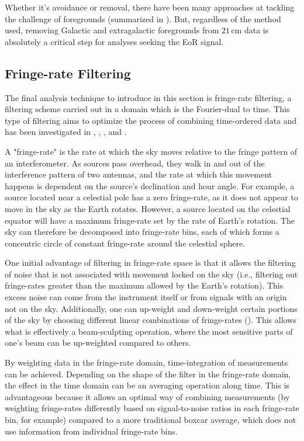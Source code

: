 Whether it's avoidance or removal, there have been many approaches at tackling the challenge of foregrounds (summarized in \citet{chapman_et_al2016}). But, regardless of the method used, removing Galactic and extragalactic foregrounds from $21$\,cm data is absolutely a critical step for analyses seeking the EoR signal. 

\subsection{Fringe-rate Filtering}
\label{sec:frf_intro}

The final analysis technique to introduce in this section is fringe-rate filtering, a filtering scheme carried out in a domain which is the Fourier-dual to time. This type of filtering aims to optimize the process of combining time-ordered data and has been investigated in \citet{roshi_perley2003}, \citet{parsons_backer2009}, \citet{offringa_et_al2012}, and \citet{parsons_et_al2016}.

A "fringe-rate" is the rate at which the sky moves relative to the fringe pattern of an interferometer. As sources pass overhead, they walk in and out of the interference pattern of two antennas, and the rate at which this movement happens is dependent on the source's declination and hour angle. For example, a source located near a celestial pole has a zero fringe-rate, as it does not appear to move in the sky as the Earth rotates. However, a source located on the celestial equator will have a maximum fringe-rate set by the rate of Earth's rotation. The sky can therefore be decomposed into fringe-rate bins, each of which forms a concentric circle of constant fringe-rate around the celestial sphere.

One initial advantage of filtering in fringe-rate space is that it allows the filtering of noise that is not associated with movement locked on the sky (i.e., filtering out fringe-rates greater than the maximum allowed by the Earth's rotation). This excess noise can come from the instrument itself or from signals with an origin not on the sky. Additionally, one can up-weight and down-weight certain portions of the sky by choosing different linear combinations of fringe-rates (\citealt{parsons_et_al2016}). This allows what is effectively a beam-sculpting operation, where the most sensitive parts of one's beam can be up-weighted compared to others.

By weighting data in the fringe-rate domain, time-integration of measurements can be achieved. Depending on the shape of the filter in the fringe-rate domain, the effect in the time domain can be an averaging operation along time. This is advantageous because it allows an optimal way of combining measurements (by weighting fringe-rates differently based on signal-to-noise ratios in each fringe-rate bin, for example) compared to a more traditional boxcar average, which does not use information from individual fringe-rate bins.

